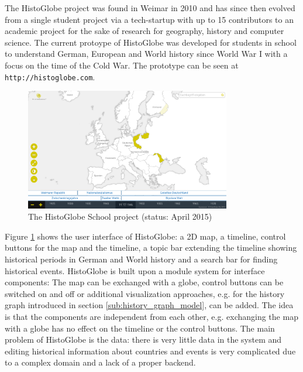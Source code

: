 The HistoGlobe project was found in Weimar in 2010 and has since then evolved from a single student project via a tech-startup with up to 15 contributors to an academic project for the sake of research for geography, history and computer science. The current protoype of HistoGlobe was developed for students in school to understand German, European and World history since World War I with a focus on the time of the Cold War. The prototype can be seen at \texttt{http://histoglobe.com}.

\begin{figure}[ht]
  \vspace{1em}
  \centering
  \includegraphics[width=0.8\textwidth]{graphics/basics/histoglobe/school_project}
  \caption{The HistoGlobe School project (status: April 2015)}
  \label{fig:histoglobe_school}
\end{figure}

Figure \ref{fig:histoglobe_school} shows the user interface of HistoGlobe: a 2D map, a timeline, control buttons for the map and the timeline, a topic bar extending the timeline showing historical periods in German and World history and a search bar for finding historical events. HistoGlobe is built upon a module system for interface components: The map can be exchanged with a globe, control buttons can be switched on and off or additional visualization approaches, e.g. for the history graph introduced in section \ref{sub:history_graph_model}, can be added. The idea is that the components are independent from each other, e.g. exchanging the map with a globe has no effect on the timeline or the control buttons. The main problem of HistoGlobe is the data: there is very little data in the system and editing historical information about countries and events is very complicated due to a complex domain and a lack of a proper backend.


\vspace{1.5em}

